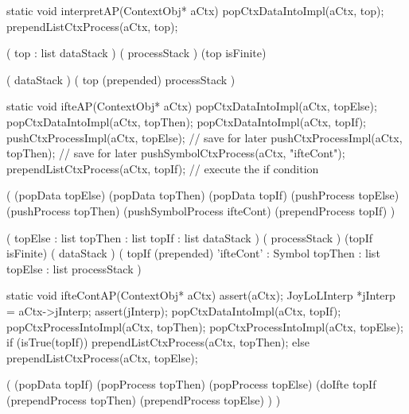 \stopWord

\stoptyping

\startCCode
static void interpretAP(ContextObj* aCtx) {
  popCtxDataIntoImpl(aCtx, top);
  prependListCtxProcess(aCtx, top);
}
\stopCCode

\starttyping

\startWord[interpret]

\preDataStack
  (
    top : list
    dataStack
  )
\preProcessStack
  (
    processStack
  )
\preConditions
  (top isFinite)
\stopPreStack

\postDataStack
  (
    dataStack
  )
\postProcessStack
  (
    top (prepended)
    processStack
  )
\postConditions
\stopPostStack

\stopWord

\stoptyping

\startJoyLoLWord[ifte]

\startCCode
static void ifteAP(ContextObj* aCtx) {
  popCtxDataIntoImpl(aCtx, topElse);
  popCtxDataIntoImpl(aCtx, topThen);
  popCtxDataIntoImpl(aCtx, topIf);
  pushCtxProcessImpl(aCtx, topElse); // save for later
  pushCtxProcessImpl(aCtx, topThen); // save for later
  pushSymbolCtxProcess(aCtx, "ifteCont");
  prependListCtxProcess(aCtx, topIf); // execute the if condition
}
\stopCCode

\startImplementation[ansic]
  (
    (popData topElse)
    (popData topThen)
    (popData topIf)
    (pushProcess topElse)
    (pushProcess topThen)
    (pushSymbolProcess ifteCont)
    (prependProcess topIf)
  )
\stopImplementation

\startRule[ifte]
\preDataStack
  (
    topElse : list
    topThen : list
    topIf   : list
    dataStack
  )
\preProcessStack
  (
    processStack
  )
\preConditions
  (topIf isFinite)
\postDataStack
  (
    dataStack
  )
\postProcessStack
  (
    topIf (prepended)
    'ifteCont' : Symbol
    topThen    : list
    topElse    : list
    processStack
  )
\postConditions
\stopRule

\stopJoyLoLWord

\startJoyLoLWord[ifteCont]

\startCCode
static void ifteContAP(ContextObj* aCtx) {
  assert(aCtx);
  JoyLoLInterp *jInterp = aCtx->jInterp;
  assert(jInterp);
  popCtxDataIntoImpl(aCtx, topIf);
  popCtxProcessIntoImpl(aCtx, topThen);
  popCtxProcessIntoImpl(aCtx, topElse);
  if (isTrue(topIf)) {
    prependListCtxProcess(aCtx, topThen);
  } else {
    prependListCtxProcess(aCtx, topElse);
  }
}
\stopCCode

\startImplementation[ansic]
  (
    (popData topIf)
    (popProcess topThen)
    (popProcess topElse)
    (doIfte topIf 
      (prependProcess topThen)
      (prependProcess topElse)
    )
  )
\stopImplementation

